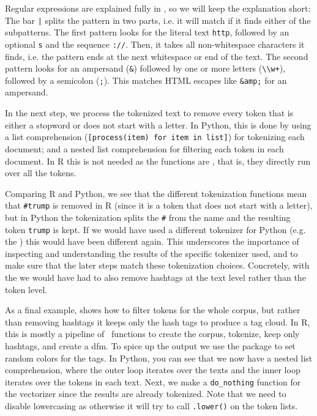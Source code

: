 Regular expressions are explained fully in , so we will keep the explanation short:
The bar \verb#|# splits the pattern in two parts, i.e. it will match if it finds either of the subpatterns.
The first pattern looks for the literal text \verb#http#, followed by an optional \verb#s# and the sequence \verb#://#.
Then, it takes all non-whitespace characters it finds, i.e. the pattern ends at the next whitespace or end of the text.
The second pattern looks for an ampersand (\verb#&#) followed by one or more letters (\verb#\\w+#), followed by a semicolon (\verb#;#).
This matches HTML escapes like \verb#&amp;# for an ampersand.

In the next step, we process the tokenized text to remove every token that is either a stopword or does not start with a letter. 
In Python, this is done by using a list comprehension (\verb#[process(item) for item in list]#) for tokenizing each document; and a nested list comprehension for filtering each token in each document.
In R this is not needed as the  functions are , that is, they directly run over all the tokens.

Comparing R and Python, we see that the different tokenization functions mean that \verb|#trump| is removed in R (since it is a token that does not start with a letter),
but in Python the tokenization splits the \verb|#| from the name and the resulting token \verb|trump| is kept.
If we would have used a different tokenizer for Python (e.g. the ) this would have been different again. 
This underscores the importance of inspecting and understanding the results of the specific tokenizer used,
and to make sure that the later steps match these tokenization choices.
Concretely, with the  we would have had to also remove hashtags at the text level rather than the token level. 


As a final example,  shows how to filter tokens for the whole corpus, but rather than removing hashtags it keeps only the hash tags to produce a tag cloud. 
In R, this is mostly a pipeline of \quanteda\ functions to create the corpus, tokenize, keep only hashtags, and create a dfm.
To spice up the output we use the  package to set random colors for the tags.
In Python, you can see that we now have a nested list comprehension, where the outer loop iterates over the texts and the inner loop iterates over the tokens in each text.
Next, we make a \verb|do_nothing| function for the vectorizer since the results are already tokenized.
Note that we need to disable lowercasing as otherwise it will try to call \verb|.lower()| on the token lists. 

